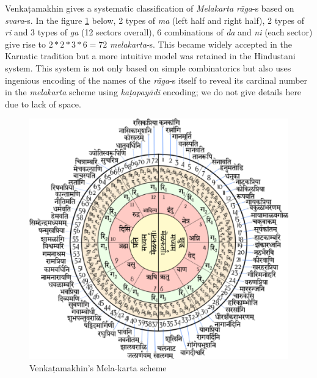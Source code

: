 Venkaṭamakhin gives a systematic classification of \textsl{Melakarta rāga}-s based on \textsl{svara}-s. In the figure \ref{chap3-fig5} below, 2 types of \textsl{ma} (left half and right half), 2 types of \textsl{ri} and 3 types of \textsl{ga} (12 sectors overall), 6 combinations of \textsl{da} and \textsl{ni} (each sector) give rise to $2*2*3*6=72$ \textsl{melakarta}-s. This became widely accepted in the Karnatic
 tradition but a more intuitive model was retained in the Hindustani system. This system is not only based on simple combinatorics but also uses ingenious encoding of the names of the \textsl{rāga}-s itself to reveal its cardinal number in the \textsl{melakarta} scheme using \textsl{kaṭapayādi} encoding; we do not give details here due to lack of space.

\begin{figure}[bhp]
\centering
\includegraphics[scale=.4]{figures/7.eps}
\caption{Venkaṭamakhin’s Mela-karta scheme}\label{chap3-fig5}
\end{figure}

